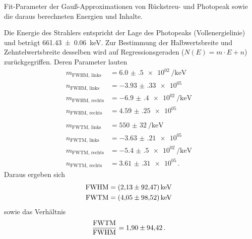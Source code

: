 \begin{table}
    \centering
    \caption{
        Fit-Parameter der Gauß-Approximationen von Rückstreu- und Photopeak
        sowie die daraus berechneten Energien und Inhalte.
    }
    \label{tab:3_Cs_137}
\end{table}

Die Energie des Strahlers entspricht der Lage des Photopeaks (Vollenergielinie)
und beträgt \SI{661.43 \pm 0.06}{\kilo\electronvolt}.
Zur Bestimmung der Halbwertsbreite und Zehntelwertsbreite desselben wird auf Regressionsgeraden ($N(E) = m·E+n$) zurückgegriffen.
Deren Parameter lauten
\begin{align*}
m_\text{FWHM, links} &= \SI{6.0(5)e+02}{\per\kilo\electronvolt} \\
n_\text{FWHM, links} &= \num{-3.93(33)e+05} \\
m_\text{FWHM, rechts} &= \SI{-6.9(4)e+02}{\per\kilo\electronvolt} \\
n_\text{FWHM, rechts} &= \num{4.59(25)e+05} \\
 \\
m_\text{FWTM, links} &= \SI{550(32)}{\per\kilo\electronvolt} \\
n_\text{FWTM, links} &= \num{-3.63(21)e+05} \\
m_\text{FWTM, rechts} &= \SI{-5.4(5)e+02}{\per\kilo\electronvolt} \\
n_\text{FWTM, rechts} &= \num{3.61(31)e+05} \, .
\end{align*}
Daraus ergeben sich
\begin{align}
    \text{FWHM} = \SI{2.13 \pm 92.47}{\kilo\electronvolt} \\
    \text{FWTM} = \SI{4.05 \pm 98.52}{\kilo\electronvolt}
\end{align}
sowie das Verhältnis
\begin{equation}
    \frac{\text{FWTM}}{\text{FWHM}} = \num{1.90 \pm 94.42} \, .
\end{equation}



